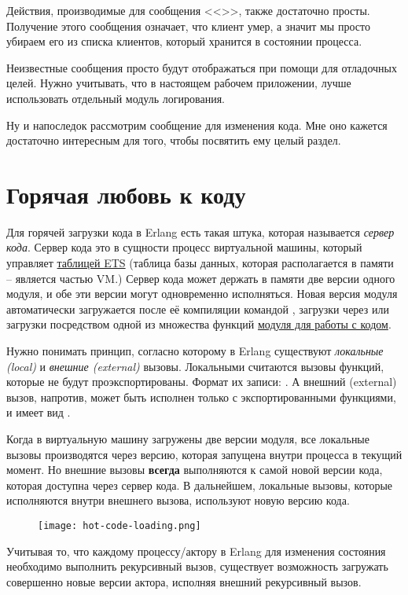 Действия, производимые для сообщения <<>>, также достаточно просты.
Получение этого сообщения означает, что клиент умер, а значит мы просто убираем его из списка клиентов, который хранится в состоянии процесса.

Неизвестные сообщения просто будут отображаться при помощи  для отладочных целей.
Нужно учитывать, что в настоящем рабочем приложении, лучше использовать отдельный модуль логирования.

Ну и напоследок рассмотрим сообщение для изменения кода.
Мне оно кажется достаточно интересным для того, чтобы посвятить ему целый раздел.
\section{Горячая любовь к коду}
\label{hot-code-loving}
Для горячей загрузки кода в Erlang есть такая штука, которая называется \emph{сервер кода}.
Сервер кода это в сущности процесс виртуальной машины, который управляет \href{http://erldocs.com/R15B/stdlib/ets.html}{таблицей ETS} (таблица базы данных, которая располагается в памяти \--- является частью VM.)
Сервер кода может держать в памяти две версии одного модуля, и обе эти версии могут одновременно исполняться.
Новая версия модуля автоматически загружается после её компиляции командой , загрузки через  или загрузки посредством одной из множества функций \href{http://erldocs.com/R15B/kernel/code.html}{модуля для работы с кодом}.

Нужно понимать принцип, согласно которому в Erlang существуют \emph{локальные (local)} и \emph{внешние (external)} вызовы.
Локальными считаются вызовы функций, которые не будут проэкспортированы.
Формат их записи: .
А внешний (external) вызов, напротив, может быть исполнен только с экспортированными функциями, и имеет вид .

Когда в виртуальную машину загружены две версии модуля, все локальные вызовы производятся через версию, которая запущена внутри процесса в текущий момент.
Но внешние вызовы \textbf{всегда} выполняются к самой новой версии кода, которая доступна через сервер кода.
В дальнейшем, локальные вызовы, которые исполняются внутри внешнего вызова, используют новую версию кода.
\begin{figure}[h!]
    \centering
    \texttt{[image: hot-code-loading.png]}
\end{figure}

Учитывая то, что каждому процессу/актору в Erlang для изменения состояния необходимо выполнить рекурсивный вызов, существует возможность загружать совершенно новые версии актора, исполняя внешний рекурсивный вызов.

